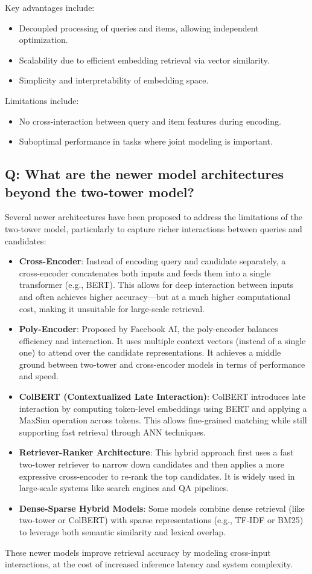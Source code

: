 \documentclass[11pt]{article}
\begin{document}
Key advantages include:
\begin{itemize}
	\item Decoupled processing of queries and items, allowing independent optimization.
	\item Scalability due to efficient embedding retrieval via vector similarity.
	\item Simplicity and interpretability of embedding space.
\end{itemize}

Limitations include:
\begin{itemize}
	\item No cross-interaction between query and item features during encoding.
	\item Suboptimal performance in tasks where joint modeling is important.
\end{itemize}

\subsection*{Q: What are the newer model architectures beyond the two-tower model?}
Several newer architectures have been proposed to address the limitations of the two-tower model, particularly to capture richer interactions between queries and candidates:

\begin{itemize}
	\item \textbf{Cross-Encoder}: Instead of encoding query and candidate separately, a cross-encoder concatenates both inputs and feeds them into a single transformer (e.g., BERT). This allows for deep interaction between inputs and often achieves higher accuracy—but at a much higher computational cost, making it unsuitable for large-scale retrieval.

	\item \textbf{Poly-Encoder}: Proposed by Facebook AI, the poly-encoder balances efficiency and interaction. It uses multiple context vectors (instead of a single one) to attend over the candidate representations. It achieves a middle ground between two-tower and cross-encoder models in terms of performance and speed.

	\item \textbf{ColBERT (Contextualized Late Interaction)}: ColBERT introduces late interaction by computing token-level embeddings using BERT and applying a MaxSim operation across tokens. This allows fine-grained matching while still supporting fast retrieval through ANN techniques.

	\item \textbf{Retriever-Ranker Architecture}: This hybrid approach first uses a fast two-tower retriever to narrow down candidates and then applies a more expressive cross-encoder to re-rank the top candidates. It is widely used in large-scale systems like search engines and QA pipelines.

	\item \textbf{Dense-Sparse Hybrid Models}: Some models combine dense retrieval (like two-tower or ColBERT) with sparse representations (e.g., TF-IDF or BM25) to leverage both semantic similarity and lexical overlap.
\end{itemize}

These newer models improve retrieval accuracy by modeling cross-input interactions, at the cost of increased inference latency and system complexity.
\end{document}
